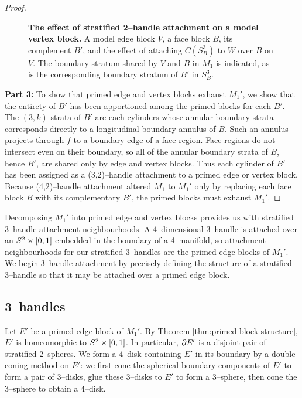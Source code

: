 \begin{proof}
	\begin{figure}[h!]
		\caption{
			\textbf{The effect of stratified 2--handle attachment on a model vertex block.}
			A model edge block $V$, a face block $B$, its complement $B'$, and the effect of attaching $C(S_B^3)$ to $W$ over $B$ on $V$.
			The boundary stratum shared by $V$ and $B$ in $M_1$ is indicated, as is the corresponding boundary stratum of $B'$ in $S_B^3$.
		}
		\label{fig:vertex-face-shared-boundary}
	\end{figure}

	\textbf{Part 3:}
	To show that primed edge and vertex blocks exhaust $M_1'$, we show that the entirety of $B'$ has been apportioned among the primed blocks for each $B'$.
	The $(3,k)$ strata of $B'$ are each cylinders whose annular boundary strata corresponds directly to a longitudinal boundary annulus of $B$.
	Such an annulus projects through $f$ to a boundary edge of a face region.
	Face regions do not intersect even on their boundary, so all of the annular boundary strata of $B$, hence $B'$, are shared only by edge and vertex blocks.
	Thus each cylinder of $B'$ has been assigned as a (3,2)--handle attachment to a primed edge or vertex block.
	Because (4,2)--handle attachment altered $M_1$ to $M_1'$ only by replacing each face block $B$ with its complementary $B'$, the primed blocks must exhaust $M_1'$.
\end{proof}

Decomposing $M_1'$ into primed edge and vertex blocks provides us with stratified 3--handle attachment neighbourhoods.
A 4--dimensional 3--handle is attached over an $S^2\times[0,1]$ embedded in the boundary of a 4--manifold, so attachment neighbourhoods for our stratified 3--handles are the primed edge blocks of $M_1'$.
We begin 3--handle attachment by precisely defining the structure of a stratified 3--handle so that it may be attached over a primed edge block.

\subsection{3--handles}
\label{subsec:smooth-3handles}

Let $E'$ be a primed edge block of $M_1'$.
By Theorem \ref{thm:primed-block-structure}, $E'$ is homeomorphic to $S^2\times[0,1]$.
In particular, $\partial E'$ is a disjoint pair of stratified 2--spheres.
We form a 4--disk containing $E'$ in its boundary by a double coning method on $E'$: we first cone the spherical boundary components of $E'$ to form a pair of 3--disks, glue these 3--disks to $E'$ to form a 3--sphere, then cone the 3--sphere to obtain a 4--disk.

